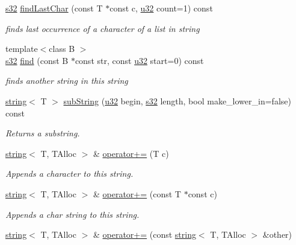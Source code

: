 \begin{DoxyCompactItemize}
\hyperlink{namespaceirr_ac66849b7a6ed16e30ebede579f9b47c6}{s32} \hyperlink{classirr_1_1core_1_1string_ae85b9cd2a8e8d4400f826c13e6f3d140}{find\+Last\+Char} (const T $\ast$const c, \hyperlink{namespaceirr_a0416a53257075833e7002efd0a18e804}{u32} count=1) const 
\begin{DoxyCompactList}\small\item\em finds last occurrence of a character of a list in string \end{DoxyCompactList}\item 
{\footnotesize template$<$class B $>$ }\\\hyperlink{namespaceirr_ac66849b7a6ed16e30ebede579f9b47c6}{s32} \hyperlink{classirr_1_1core_1_1string_a4c7f9b29d55e81fde3f13980bd7a2799}{find} (const B $\ast$const str, const \hyperlink{namespaceirr_a0416a53257075833e7002efd0a18e804}{u32} start=0) const 
\begin{DoxyCompactList}\small\item\em finds another string in this string \end{DoxyCompactList}\item 
\hyperlink{classirr_1_1core_1_1string}{string}$<$ T $>$ \hyperlink{classirr_1_1core_1_1string_ae4317f0bcb66c1558e21ad4456bcdc0b}{sub\+String} (\hyperlink{namespaceirr_a0416a53257075833e7002efd0a18e804}{u32} begin, \hyperlink{namespaceirr_ac66849b7a6ed16e30ebede579f9b47c6}{s32} length, bool make\+\_\+lower\+\_\+in=false) const 
\begin{DoxyCompactList}\small\item\em Returns a substring. \end{DoxyCompactList}\item 
\hyperlink{classirr_1_1core_1_1string}{string}$<$ T, T\+Alloc $>$ \& \hyperlink{classirr_1_1core_1_1string_acf10d2688d4276476f918ce8821fbd30}{operator+=} (T c)
\begin{DoxyCompactList}\small\item\em Appends a character to this string. \end{DoxyCompactList}\item 
\hyperlink{classirr_1_1core_1_1string}{string}$<$ T, T\+Alloc $>$ \& \hyperlink{classirr_1_1core_1_1string_aa256902e8686726994677ff008a5653d}{operator+=} (const T $\ast$const c)
\begin{DoxyCompactList}\small\item\em Appends a char string to this string. \end{DoxyCompactList}\item 
\hyperlink{classirr_1_1core_1_1string}{string}$<$ T, T\+Alloc $>$ \& \hyperlink{classirr_1_1core_1_1string_a5e5e68dd049d36007cab6ce41a304aca}{operator+=} (const \hyperlink{classirr_1_1core_1_1string}{string}$<$ T, T\+Alloc $>$ \&other)

\end{DoxyCompactItemize}
